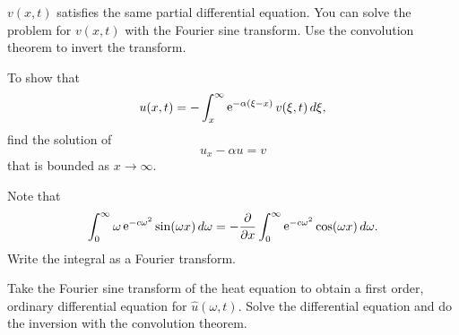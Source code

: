 {%
\begin{Hint}
\end{Hint}




\begin{Hint}
  $v(x,t)$ satisfies the same partial differential equation.  You can solve
  the problem for $v(x,t)$ with the Fourier sine transform.  Use the 
  convolution theorem to invert the transform.

  To show that 
  \[
  u(x,t) = - \int_x^\infty \mathop{\mathrm{e}}\nolimits^{-\alpha (\xi-x)} v(\xi,t) \,d\xi,
  \]
  find the solution of 
  \[
  u_x - \alpha u = v
  \]
  that is bounded as $x \to \infty$.
\end{Hint}



\begin{Hint}
  Note that
  \[
  \int_0^\infty \omega \mathop{\mathrm{e}}\nolimits^{-c \omega^2} \sin(\omega x) \,d \omega 
  = - \frac{\partial}{\partial x} \int_0^\infty \mathop{\mathrm{e}}\nolimits^{-c \omega^2} \cos(\omega x) \,d \omega.
  \]
  Write the integral as a Fourier transform.

  Take the Fourier sine transform of the heat equation to obtain a first order,
  ordinary differential equation for $\hat{u}(\omega,t)$.  Solve the 
  differential equation and do the inversion with the convolution 
  theorem.
\end{Hint}






\begin{Hint}
\end{Hint}



\begin{Hint}
\end{Hint}



\begin{Hint}
\end{Hint}








\begin{Hint}
\end{Hint}







\begin{Hint}
\end{Hint}











\raggedbottom
}
